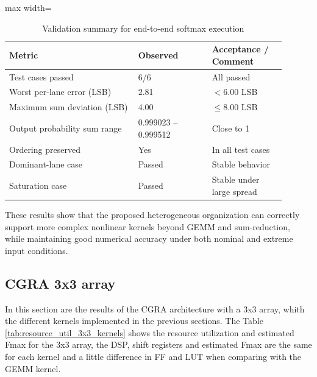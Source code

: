 \documentclass[conference]{IEEEtran}
\begin{document}
\begin{table}[htbp]
\centering
\caption{Validation summary for end-to-end softmax execution}
\label{tab:softmax_validation}
\scriptsize
\begin{adjustbox}{max width=\columnwidth}
\begin{tabular}{@{}p{0.42\linewidth}p{0.24\linewidth}p{0.24\linewidth}@{}}
\toprule
\textbf{Metric} & \textbf{Observed} & \textbf{Acceptance / Comment} \\
\midrule
Test cases passed & 6/6 & All passed \\
Worst per-lane error (LSB) & 2.81 & $< 6.00$ LSB \\
Maximum sum deviation (LSB) & 4.00 & $\leq 8.00$ LSB \\
Output probability sum range & 0.999023 -- 0.999512 & Close to 1 \\
Ordering preserved & Yes & In all test cases \\
Dominant-lane case & Passed & Stable behavior \\
Saturation case & Passed & Stable under large spread \\
\bottomrule
\end{tabular}
\end{adjustbox}
\end{table}

These results show that the proposed heterogeneous organization can correctly support more complex nonlinear kernels beyond GEMM and sum-reduction, while maintaining good numerical accuracy under both nominal and extreme input conditions.


\subsection{CGRA 3x3 array}

In this section are the results of the CGRA architecture with a 3x3 array, whith the different kernels implemented in the previous sections. 
The Table \ref{tab:resource_util_3x3_kernels} shows the resource utilization and estimated Fmax for the 3x3 array, the DSP, shift registers and estimated Fmax are the same for each kernel and a little difference in FF and LUT when comparing with the GEMM kernel.
\end{document}
